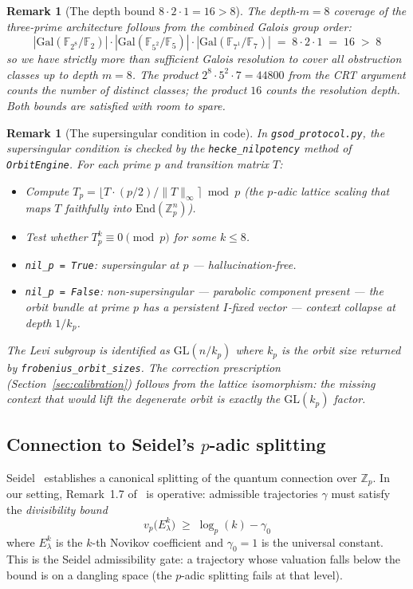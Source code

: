 \documentclass[11pt,a4paper]{article}
\newtheorem{remark}[theorem]{Remark}
\begin{document}
\begin{remark}[The depth bound $8 \cdot 2 \cdot 1 = 16 > 8$]
The depth-$m=8$ coverage of the three-prime architecture follows
from the combined Galois group order:
\[
  |\mathrm{Gal}(\mathbb{F}_{2^8}/\mathbb{F}_2)|
  \cdot |\mathrm{Gal}(\mathbb{F}_{5^2}/\mathbb{F}_5)|
  \cdot |\mathrm{Gal}(\mathbb{F}_{7^1}/\mathbb{F}_7)|
  \;=\; 8 \cdot 2 \cdot 1 \;=\; 16 \;>\; 8
\]
so we have strictly more than sufficient Galois resolution to cover
all obstruction classes up to depth $m=8$.
The product $2^8 \cdot 5^2 \cdot 7 = 44800$ from the CRT argument
counts the number of distinct classes; the product $16$ counts the
resolution depth. Both bounds are satisfied with room to spare.
\end{remark}

\begin{remark}[The supersingular condition in code]
In \texttt{gsod\_protocol.py}, the supersingular condition is checked
by the \texttt{hecke\_nilpotency} method of \texttt{OrbitEngine}.
For each prime $p$ and transition matrix $T$:
\begin{itemize}
  \item Compute $T_p = \lfloor T \cdot (p/2) / \|T\|_\infty \rceil \bmod p$
        (the $p$-adic lattice scaling that maps $T$ faithfully into
        $\mathrm{End}(\mathbb{Z}_p^n)$).
  \item Test whether $T_p^k \equiv 0 \pmod{p}$ for some $k \leq 8$.
  \item \texttt{nil\_p = True}: supersingular at $p$ --- hallucination-free.
  \item \texttt{nil\_p = False}: non-supersingular --- parabolic component
        present --- the orbit bundle at prime $p$ has a persistent
        $I$-fixed vector --- context collapse at depth $1/k_p$.
\end{itemize}
The Levi subgroup is identified as $\mathrm{GL}(n/k_p)$ where $k_p$
is the orbit size returned by \texttt{frobenius\_orbit\_sizes}.
The correction prescription (Section~\ref{sec:calibration})
follows from the lattice isomorphism: the missing context that
would lift the degenerate orbit is exactly the $\mathrm{GL}(k_p)$
factor.
\end{remark}

\subsection{Connection to Seidel's $p$-adic splitting}

Seidel~\cite{Seidel25} establishes a canonical splitting of the
quantum connection over $\mathbb{Z}_p$.
In our setting, Remark~1.7 of~\cite{Seidel25} is operative:
admissible trajectories $\gamma$ must satisfy the \emph{divisibility
bound}
\[
  v_p\!\bigl(E_\lambda^k\bigr) \;\geq\; \log_p(k) - \gamma_0
\]
where $E_\lambda^k$ is the $k$-th Novikov coefficient and
$\gamma_0 = 1$ is the universal constant.
This is the Seidel admissibility gate: a trajectory whose
valuation falls below the bound is on a dangling space
(the $p$-adic splitting fails at that level).
\end{document}
